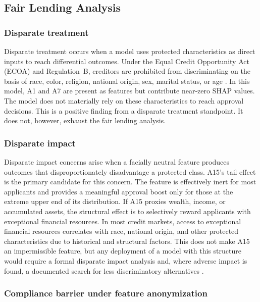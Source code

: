 \documentclass[11pt]{article}
\begin{document}
\subsection{Fair Lending Analysis}
\label{sec:fairlending}

\subsubsection*{Disparate treatment}

Disparate treatment occurs when a model uses protected characteristics as direct inputs to reach differential outcomes. Under the Equal Credit Opportunity Act (ECOA) and Regulation~B, creditors are prohibited from discriminating on the basis of race, color, religion, national origin, sex, marital status, or age \citep{cfpb2022}. In this model, A1 and A7 are present as features but contribute near-zero SHAP values. The model does not materially rely on these characteristics to reach approval decisions. This is a positive finding from a disparate treatment standpoint. It does not, however, exhaust the fair lending analysis.

\subsubsection*{Disparate impact}

Disparate impact concerns arise when a facially neutral feature produces outcomes that disproportionately disadvantage a protected class. A15's tail effect is the primary candidate for this concern. The feature is effectively inert for most applicants and provides a meaningful approval boost only for those at the extreme upper end of its distribution. If A15 proxies wealth, income, or accumulated assets, the structural effect is to selectively reward applicants with exceptional financial resources. In most credit markets, access to exceptional financial resources correlates with race, national origin, and other protected characteristics due to historical and structural factors. This does not make A15 an impermissible feature, but any deployment of a model with this structure would require a formal disparate impact analysis and, where adverse impact is found, a documented search for less discriminatory alternatives \citep{dobbie2024, asurity2024}.

\subsubsection*{Compliance barrier under feature anonymization}
\end{document}
